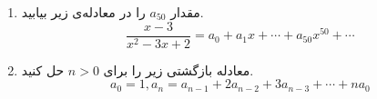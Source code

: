     \p 
\begin{enumerate}
\item
مقدار
$a_{50}$
را در معادله‌ی زیر بیابید.
$$\frac{x - 3}{x^2 - 3x + 2} = a_0 + a_1x + \cdots + a_{50}x^{50} + \cdots$$
\item
معادله بازگشتی زیر را برای
$n > 0$
حل کنید.
$$a_0 = 1, a_n = a_{n-1} + 2a_{n-2} + 3a_{n-3} + \cdots + na_0$$
\end{enumerate}